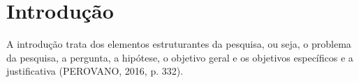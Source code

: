 \chapter{Introdução}

A introdução trata dos elementos estruturantes da pesquisa, ou seja, o
problema da pesquisa, a pergunta, a hipótese, o objetivo geral e os objetivos
específicos e a justificativa (PEROVANO, 2016, p. 332).